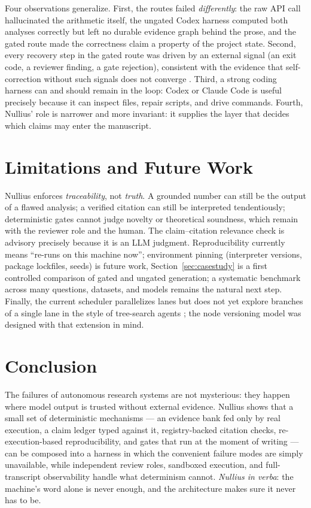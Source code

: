 \documentclass[11pt]{article}
\begin{document}
Four observations generalize. First, the routes failed \emph{differently}: the raw API call hallucinated the arithmetic itself, the ungated Codex harness computed both analyses correctly but left no durable evidence graph behind the prose, and the gated route made the correctness claim a property of the project state. Second, every recovery step in the gated route was driven by an external signal (an exit code, a reviewer finding, a gate rejection), consistent with the evidence that self-correction without such signals does not converge \cite{huang2024}. Third, a strong coding harness can and should remain in the loop: Codex or Claude Code is useful precisely because it can inspect files, repair scripts, and drive commands. Fourth, Nullius' role is narrower and more invariant: it supplies the layer that decides which claims may enter the manuscript.

\section{Limitations and Future Work}

Nullius enforces \emph{traceability}, not \emph{truth}. A grounded number can still be the output of a flawed analysis; a verified citation can still be interpreted tendentiously; deterministic gates cannot judge novelty or theoretical soundness, which remain with the reviewer role and the human. The claim--citation relevance check is advisory precisely because it is an LLM judgment. Reproducibility currently means ``re-runs on this machine now''; environment pinning (interpreter versions, package lockfiles, seeds) is future work, Section~\ref{sec:casestudy} is a first controlled comparison of gated and ungated generation; a systematic benchmark across many questions, datasets, and models remains the natural next step. Finally, the current scheduler parallelizes lanes but does not yet explore branches of a single lane in the style of tree-search agents \cite{aisci2}; the node versioning model was designed with that extension in mind.

\section{Conclusion}

The failures of autonomous research systems are not mysterious: they happen where model output is trusted without external evidence. Nullius shows that a small set of deterministic mechanisms --- an evidence bank fed only by real execution, a claim ledger typed against it, registry-backed citation checks, re-execution-based reproducibility, and gates that run at the moment of writing --- can be composed into a harness in which the convenient failure modes are simply unavailable, while independent review roles, sandboxed execution, and full-transcript observability handle what determinism cannot. \emph{Nullius in verba}: the machine's word alone is never enough, and the architecture makes sure it never has to be.
\end{document}
